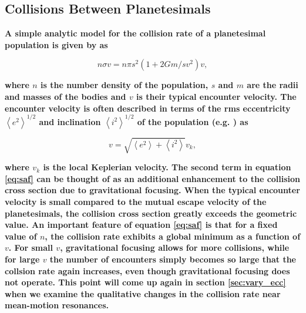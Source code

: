 \documentclass[fleqn,usenatbib]{mnras}
\begin{document}



\subsection{Collisions Between Planetesimals}\label{sec:colleq}

\textbf{A simple analytic model for the collision rate of a planetesimal population is given by \citet{1969edo..book.....S} as}

\begin{equation}\label{eq:saf}
	n \sigma v = n \pi s^{2} \left( 1 + 2 G m / s v^{2} \right) v,
\end{equation}

\noindent\textbf{where $n$ is the number density of the population, $s$ and $m$ are the radii and masses of the bodies and $v$ is their typical encounter velocity. The encounter velocity is often described in terms of the rms eccentricity $\left<e^{2}\right>^{1/2}$ and inclination $\left<i^{2}\right>^{1/2}$ of the population (e.g. \citet{1993ARA&A..31..129L}) as}

\begin{equation}\label{eq:eccincvel}
	v = \sqrt{\left< e^{2} \right> + \left< i^{2} \right>} v_{k},
\end{equation}

\noindent\textbf{where $v_{k}$ is the local Keplerian velocity. The second term in equation \ref{eq:saf} can be thought of as an additional enhancement to the collision cross section due to gravitational focusing. When the typical encounter velocity is small compared to the mutual escape velocity of the planetesimals, the collision cross section greatly exceeds the geometric value. An important feature of equation \ref{eq:saf} is that for a fixed value of $n$, the collision rate exhibits a global minimum as a function of $v$. For small $v$, gravitational focusing allows for more collisions, while for large $v$ the number of encounters simply becomes so large that the collsion rate again increases, even though gravitational focusing does not operate. This point will come up again in section \ref{sec:vary_ecc} when we examine the qualitative changes in the collision rate near mean-motion resonances.}
\end{document}
